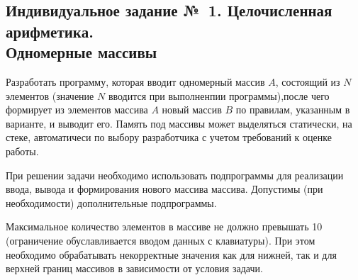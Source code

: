 \documentclass[a4paper, 12pt, oneside]{article}
\begin{document}
\begin{center}
\section*{Индивидуальное задание №~1. Целочисленная арифметика. \\ Одномерные массивы}
\end{center}

Разработать программу, которая вводит одномерный массив $A$, состоящий из $N$ элементов (значение $N$ вводится при выполненпии программы),после чего формирует из элементов массива $A$ новый массив $B$ по правилам, указанным в варианте, и выводит его. Память под массивы может выделяться статически, на стеке, автоматичеси по выбору разработчика с учетом требований к оценке работы.

При решении задачи необходимо использовать подпрограммы для реализации ввода, вывода и формирования нового массива массива. Допустимы (при необходимости) дополнительные подпрограммы.

Максимальное количество элементов в массиве не должно превышать 10 (ограничение обуславливается вводом данных с клавиатуры). При этом необходимо обрабатывать некорректные значения как для нижней, так и для верхней границ массивов в зависимости от условия задачи.
\end{document}
